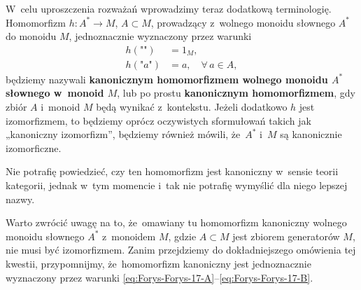 \documentclass[a4paper,11pt]{article}
\begin{document}
\start {} W~celu uproszczenia rozważań wprowadzimy teraz
dodatkową terminologię. Homomorfizm $h : A^{ * } \to M$,
$A \subset M$, prowadzący z~wolnego monoidu słownego $A^{ * }$ do
monoidu $M$, jednoznacznie wyznaczony przez warunki
\begin{subequations}
  \begin{align}
    \label{eq:Forys-Forys-17-A}
    h( \texttt{""} ) &= 1_{ M }, \\
    \label{eq:Forys-Forys-17-B}
    h( \texttt{"} a \texttt{"} ) &= a, \quad
                                   \forall \, a \in A,
  \end{align}
\end{subequations}
będziemy nazywali \textbf{kanonicznym homomorfizmem wolnego monoidu
  $A^{ * }$ słownego w~monoid $M$}, lub po prostu \textbf{kanonicznym
  homomorfizmem}, gdy zbiór $A$ i~monoid $M$ będą wynikać z~kontekstu.
Jeżeli dodatkowo $h$ jest izomorfizmem, to będziemy oprócz oczywistych
sformułowań takich jak „kanoniczny izomorfizm”, będziemy również
mówili, że~$A^{ * }$ i~$M$ są kanonicznie izomorficzne.

Nie potrafię powiedzieć, czy ten homomorfizm jest kanoniczny w~sensie
teorii kategorii, jednak w~tym momencie i~tak nie potrafię wymyślić
dla niego lepszej nazwy.

\vspace{\spaceFour}





\start {} Warto zwrócić uwagę na to, że~omawiany tu homomorfizm
kanoniczny wolnego monoidu słownego $A^{ * }$ z~monoidem $M$, gdzie
$A \subset M$ jest zbiorem generatorów $M$, nie musi być izomorfizmem.
Zanim przejdziemy do dokładniejszego omówienia tej kwestii,
przypomnijmy, że~homomorfizm kanoniczny jest jednoznacznie wyznaczony
przez warunki \eqref{eq:Forys-Forys-17-A}--\eqref{eq:Forys-Forys-17-B}.
\end{document}
